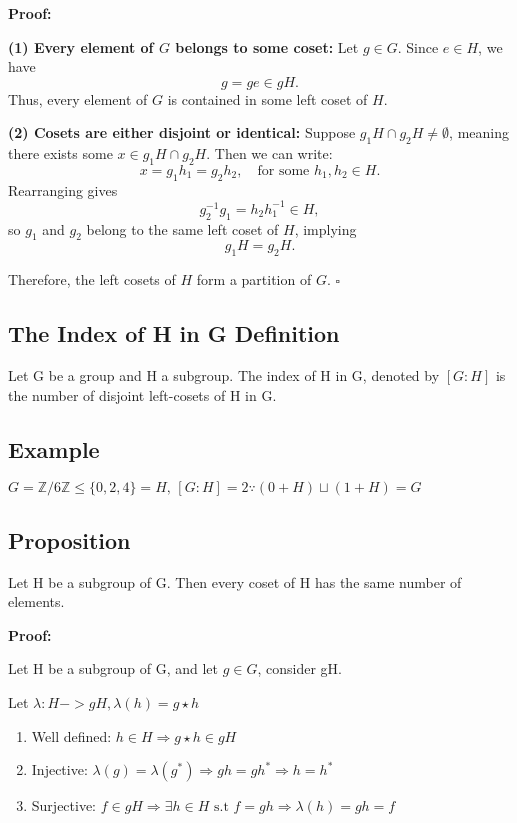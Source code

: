 \documentclass[12pt]{article}
\theoremstyle{plain}
\begin{document}
\noindent
\textbf{Proof:}

\noindent
\textbf{(1) Every element of \( G \) belongs to some coset:}  
Let \( g \in G \). Since \( e \in H \), we have
\[
g = g e \in gH.
\]
Thus, every element of \( G \) is contained in some left coset of \( H \).

\noindent
\textbf{(2) Cosets are either disjoint or identical:}  
Suppose \( g_1H \cap g_2H \neq \emptyset \), meaning there exists some \( x \in g_1H \cap g_2H \). Then we can write:
\[
x = g_1 h_1 = g_2 h_2, \quad \text{for some } h_1, h_2 \in H.
\]
Rearranging gives
\[
g_2^{-1} g_1 = h_2 h_1^{-1} \in H,
\]
so \( g_1 \) and \( g_2 \) belong to the same left coset of \( H \), implying
\[
g_1H = g_2H.
\]

\noindent
Therefore, the left cosets of \( H \) form a partition of \( G \). \(\square\)

\subsection*{The Index of H in G Definition}
Let G be a group and H a subgroup. The index of H in G, denoted by \([G:H]\) is 
the number of disjoint left-cosets of H in G.

\subsection*{Example} 
\(G = \mathbb Z/6\mathbb Z \leq \{0,2,4\} = H \text{, }[G:H] = 2 \because 
(0+H)\sqcup (1+H) = G\)

\subsection*{Proposition}
Let H be a subgroup of G. Then every coset of H has the same number of elements.

\noindent
\textbf{Proof: } 

\noindent 
Let H be a subgroup of G, and let \(g \in G\), consider gH.

\noindent 
Let \(\lambda : H -> gH, \lambda (h) = g \star h\)

\noindent 
\begin{enumerate}
  \item Well defined: \(h \in H \Rightarrow g \star h \in gH\)
  \item Injective: \(\lambda (g) = \lambda (g^*) \Rightarrow gh = gh^* 
    \Rightarrow h = h^* 
  \)
  \item Surjective: \(f \in gH \Rightarrow \exists h \in H \text{ s.t } f = gh 
    \Rightarrow \lambda (h) = gh = f\)

\end{enumerate}
\end{document}
